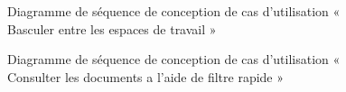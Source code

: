 \begin{figure}[H]
  \centering
  \caption{Diagramme de séquence de conception de cas d'utilisation « Basculer entre les espaces de travail »}
  \label{fig:sequence_conception_sequence_switch_workspace}
\end{figure}


\begin{figure}[H]
  \centering
  \caption{Diagramme de séquence de conception de cas d'utilisation « Consulter les documents a l'aide de filtre rapide »}
  \label{fig:sequence_conception_consulter_documents_filtre_rapide}
\end{figure}

